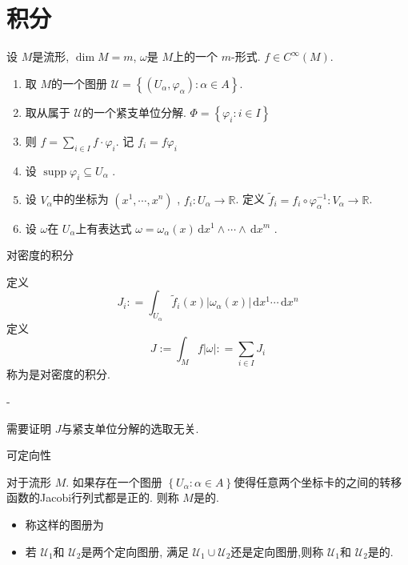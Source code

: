 \documentclass[../main.tex]{subfiles}
\begin{document}
  \section{积分}
  
设 \(  M  \)是流形, \(  \operatorname{dim}M =  m  \), \(   \omega   \)是 \(  M  \)上的一个 \(  m  \)-形式. \(  f \in C^{\infty}\left( M \right)   \). 
  \begin{enumerate}
    \item 取 \(  M  \)的一个图册 \(  \mathcal{U}= \left\{ \left( U_{\alpha } , \varphi _{\alpha }\right): \alpha \in A  \right\}  \). 
    \item 取从属于 \(  \mathcal{U}  \)的一个紧支单位分解. \(  \Phi = \left\{  \varphi _{i}: i \in I \right\}  \)    
    \item 则 \(  f = \sum _{i \in I}f\cdot  \varphi _{i}  \). 记 \(  f_{i}= f \varphi _{i}  \)  
    \item 设 \(  \operatorname{supp} \varphi _{i}\subseteq U_{\alpha }  \) . 
    \item   设 \(  V_{\alpha }  \)中的坐标为 \(  \left(  x^1,\cdots,x^n  \right)   \) , \(  f_{i}: U_{ \alpha }\to \mathbb{R}   \). 定义 \(  \tilde{f}_{i}= f_{i}\circ  \varphi _{\alpha }^{-1} : V_{\alpha }\to \mathbb{R}   \).  
    \item  设 \(   \omega   \)在 \(  U_{\alpha }  \)上有表达式 \(   \omega  =  \omega _{\alpha }\left( x \right)\,\mathrm{d} x^{1}\wedge \cdots \wedge \,\mathrm{d} x^{m}   \)   . 
  \end{enumerate}
  \begin{definition}{对密度的积分}{}
    
  
   定义 \[
   J_{i}: =  \int_{U_{\alpha }} \tilde{f}_{i}\left( x \right)\left|  \omega _{\alpha }\left( x \right)  \right|\,\mathrm{d} x^{1}\cdots \,\mathrm{d} x^{n}  
   \]定义 \[
   J:= \int_{M}f\left|  \omega  \right|: =  \sum _{i \in I}J_{i} 
   \]称为是对密度的积分.
  \end{definition}
        
-  \begin{remark}
    需要证明 \(  J  \)与紧支单位分解的选取无关.  
  \end{remark}
  
\begin{definition}{可定向性}{}
  
  对于流形 \(  M  \). 如果存在一个图册 \(  \left\{ U_{\alpha }: \alpha \in A \right\}  \)使得任意两个坐标卡的之间的转移函数的Jacobi行列式都是正的. 则称 \(  M  \)是的.   
  \begin{itemize}
    \item  称这样的图册为
    \item 若 \(  \mathcal{U_1}  \)和 \(  \mathcal{U_2}  \)是两个定向图册, 满足 \(  \mathcal{U}_{1}\cup  \mathcal{U}_{2}  \)还是定向图册,则称 \(  \mathcal{U}_{1}  \)和 \(  \mathcal{U}_{2}  \)是的.     
  \end{itemize}
  
\end{definition}
\end{document}

